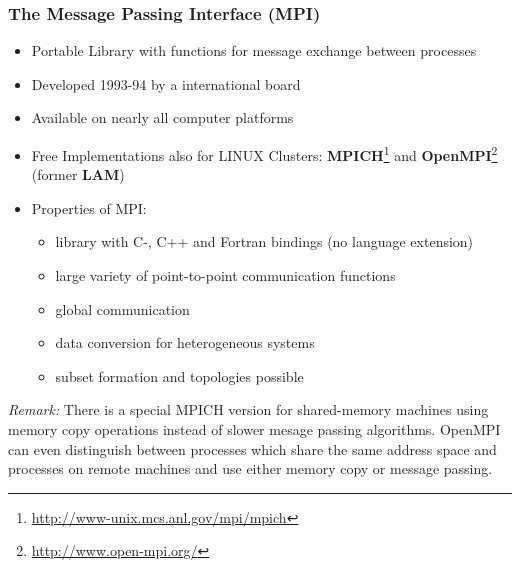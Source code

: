 \begin{frame}
\frametitle{The Message Passing Interface (MPI)}

\begin{itemize}
\item Portable Library with functions for message exchange between processes
\item Developed 1993-94 by a international board
\item Available on nearly all computer platforms
\item Free Implementations also for LINUX Clusters: {\bf MPICH}\footnote{\href{http://www-unix.mcs.anl.gov/mpi/mpich}{{\tiny http://www-unix.mcs.anl.gov/mpi/mpich}}}
 and {\bf OpenMPI}\footnote{\href{http://www.open-mpi.org/}{{\tiny http://www.open-mpi.org/}}} (former {\bf LAM})
\item Properties of MPI:
\begin{itemize}
\item library with C-, C++ and Fortran bindings (no language extension)
\item large variety of point-to-point communication functions
\item global communication
\item data conversion for heterogeneous systems
\item subset formation and topologies possible
\end{itemize}

\end{itemize}

\begin{small}\textit{Remark:} There is a special MPICH version for shared-memory machines using memory copy operations instead of slower mesage passing algorithms.
OpenMPI can even distinguish between processes which share the same address space and
processes on remote machines and use either memory copy or message passing.
\end{small}
\end{frame}

